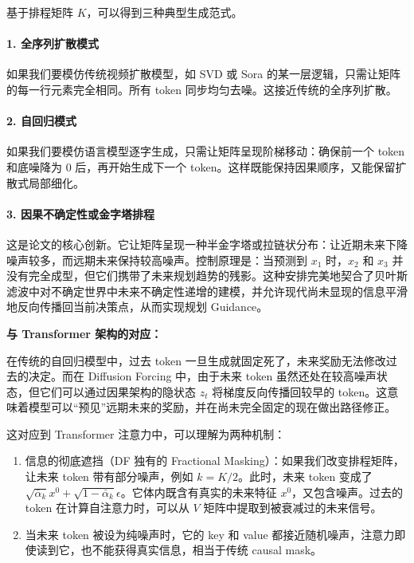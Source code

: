 基于排程矩阵 \(K\)，可以得到三种典型生成范式。

\hypertarget{ux5168ux5e8fux5217ux6269ux6563ux6a21ux5f0f}{%
\paragraph{1. 全序列扩散模式}\label{ux5168ux5e8fux5217ux6269ux6563ux6a21ux5f0f}}

如果我们要模仿传统视频扩散模型，如 SVD 或 Sora 的某一层逻辑，只需让矩阵的每一行元素完全相同。所有 token 同步均匀去噪。这接近传统的全序列扩散。

\hypertarget{ux81eaux56deux5f52ux6a21ux5f0f}{%
\paragraph{2. 自回归模式}\label{ux81eaux56deux5f52ux6a21ux5f0f}}

如果我们要模仿语言模型逐字生成，只需让矩阵呈现阶梯移动：确保前一个 token 和底噪降为 0 后，再开始生成下一个 token。这样既能保持因果顺序，又能保留扩散式局部细化。

\hypertarget{ux56e0ux679cux4e0dux786eux5b9aux6027ux6216ux91d1ux5b57ux5854ux6392ux7a0b}{%
\paragraph{3. 因果不确定性或金字塔排程}\label{ux56e0ux679cux4e0dux786eux5b9aux6027ux6216ux91d1ux5b57ux5854ux6392ux7a0b}}

这是论文的核心创新。它让矩阵呈现一种半金字塔或拉链状分布：让近期未来下降噪声较多，而远期未来保持较高噪声。控制原理是：当预测到 \(x_1\) 时，\(x_2\) 和 \(x_3\) 并没有完全成型，但它们携带了未来规划趋势的残影。这种安排完美地契合了贝叶斯滤波中对不确定世界中未来不确定性递增的建模，并允许现代尚未显现的信息平滑地反向传播回当前决策点，从而实现规划 Guidance。

\textbf{与 Transformer 架构的对应：}

在传统的自回归模型中，过去 token 一旦生成就固定死了，未来奖励无法修改过去的决定。而在 Diffusion Forcing 中，由于未来 token 虽然还处在较高噪声状态，但它们可以通过因果架构的隐状态 \(z_t\) 将梯度反向传播回较早的 token。这意味着模型可以``预见''远期未来的奖励，并在尚未完全固定的现在做出路径修正。

这对应到 Transformer 注意力中，可以理解为两种机制：

\begin{enumerate}
\def\labelenumi{\arabic{enumi}.}
\tightlist
\item
  信息的彻底遮挡（DF 独有的 Fractional Masking）：如果我们改变排程矩阵，让未来 token 带有部分噪声，例如 \(k=K/2\)。此时，未来 token 变成了 \(\sqrt{\bar{\alpha}_k}x^0+\sqrt{1-\bar{\alpha}_k}\epsilon\)。它体内既含有真实的未来特征 \(x^0\)，又包含噪声。过去的 token 在计算自注意力时，可以从 \(V\) 矩阵中提取到被衰减过的未来信号。
\item
  当未来 token 被设为纯噪声时，它的 key 和 value 都接近随机噪声，注意力即使读到它，也不能获得真实信息，相当于传统 causal mask。
\end{enumerate}

